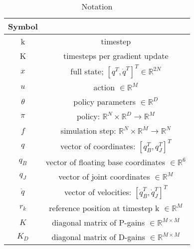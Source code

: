 \documentclass{article}
\begin{document}
\renewcommand{\arraystretch}{1.3}
\begin{table}[ht]

    \centering
    \begin{tabular}{|c|c|}
        \hline
        \textbf{Symbol} &                                                                              \\
        \hline
        k               & timestep                                                                     \\
        \hline
        K               & timesteps per gradient update                                                \\
        \hline
        $x$             & full state; $[q^T, \dot{q}^T]^T \in \mathbb{R}^{2N}$                         \\
        \hline
        $u$             & action $\in \mathbb{R}^M$                                                    \\
        \hline
        $\theta$        & policy parameters $\in \mathbb{R}^D$                                         \\
        \hline
        $\pi$           & policy: $\mathbb{R}^N \times \mathbb{R}^D \rightarrow \mathbb{R}^M$          \\
        \hline
        $f$             & simulation step: $\mathbb{R}^N \times \mathbb{R}^M \rightarrow \mathbb{R}^N$ \\
        \hline
        $q$             & vector of coordinates: $[q_B^T, q_J^T]^T$                                    \\
        \hline
        $q_B$           & vector of floating base coordinates $\in \mathbb{R}^6$                       \\
        \hline
        $q_J$           & vector of joint coordinates $\in \mathbb{R}^M$                               \\
        \hline
        $\dot{q}$       & vector of velocities: $[\dot{q}_B^T, \dot{q}_J^T]^T$                         \\
        \hline
        $r_k$           & reference position at timestep k $\in \mathbb{R}^M$                          \\
        \hline
        $K$             & diagonal matrix of P-gains $\in \mathbb{R}^{M\times M}$                      \\
        \hline
        $K_D$           & diagonal matrix of D-gains $\in \mathbb{R}^{M\times M}$                      \\
        \hline
    \end{tabular}

    \caption{Notation}
    \label{tab:ch_1_symbols}
\end{table}
\end{document}
